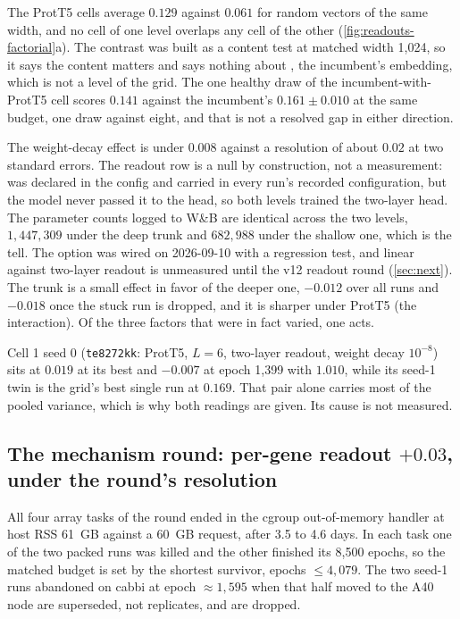  The ProtT5
cells average $0.129$ against $0.061$ for random vectors of the same width, and no cell of
one level overlaps any cell of the other (\cref{fig:readouts-factorial}a). The contrast was
built as a content test at matched width 1{,}024, so it says the content matters and says
nothing about , the incumbent's embedding, which is not a level of the grid. The
one healthy draw of the incumbent-with-ProtT5 cell scores $0.141$ against the incumbent's
$0.161 \pm 0.010$ at the same budget, one draw against eight, and that is not a resolved gap
in either direction.

 The weight-decay
effect is under $0.008$ against a resolution of about $0.02$ at two standard errors. The
readout row is a null by construction, not a measurement:  was
declared in the config and carried in every run's recorded configuration, but the model
never passed it to the head, so both levels trained the two-layer head. The parameter
counts logged to W\&B are identical across the two levels, $1{,}447{,}309$ under the deep
trunk and $682{,}988$ under the shallow one, which is the tell. The option was wired on
2026-09-10 with a regression test, and linear against two-layer readout is unmeasured until
the v12 readout round (\cref{sec:next}). The trunk is a small effect in favor of the deeper
one, $-0.012$ over all runs and $-0.018$ once the stuck run is dropped, and it is sharper
under ProtT5 (the interaction). Of the three factors that were in fact varied, one acts.

 Cell 1 seed 0 (\texttt{te8272kk}: ProtT5, $L{=}6$,
two-layer readout, weight decay $10^{-8}$) sits at $0.019$ at its best and $-0.007$ at
epoch 1{,}399 with  $1.010$, while its seed-1 twin is the grid's best single run
at $0.169$. That pair alone carries most of the pooled variance, which is why both readings
are given. Its cause is not measured.

\subsection{The mechanism round: per-gene readout $+0.03$, under the round's resolution
}
\label{sec:readouts-mech}

All four array tasks of the round ended in the cgroup out-of-memory handler at host RSS
61~GB against a 60~GB request, after 3.5 to 4.6 days. In each task one of the two packed
runs was killed and the other finished its 8{,}500 epochs, so the matched budget is set by
the shortest survivor, epochs $\le 4{,}079$. The two seed-1 runs abandoned on cabbi at epoch
${\approx}1{,}595$ when that half moved to the A40 node are superseded, not replicates, and
are dropped.

